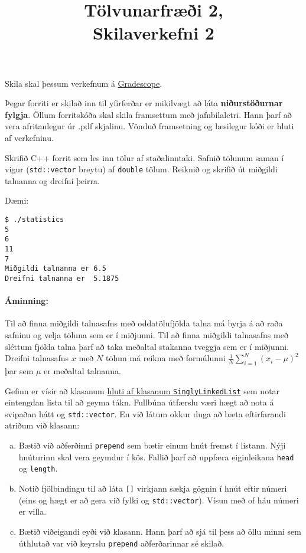 \documentclass{article}
\title{Tölvunarfræði 2, \semester \\ Skilaverkefni 2}
\author{}
\begin{document}
\maketitle
{}

Skila skal þessum verkefnum á \href{https://gradescope.com/courses/14122}{Gradescope}.

Þegar forriti er skilað inn til yfirferðar er mikilvægt að láta \textbf{niðurstöðurnar fylgja}. Öllum forritskóða skal skila framsettum með jafnbilaletri. Hann þarf að vera afritanlegur úr .pdf skjalinu. Vönduð framsetning og læsilegur kóði er hluti af verkefninu.

\question

Skrifið C++ forrit sem les inn tölur af staðalinntaki. Safnið tölunum saman í vigur (\texttt{std::vector} breytu) af \texttt{double} tölum. Reiknið og skrifið út miðgildi  talnanna og dreifni  þeirra.

Dæmi:
\begin{verbatim}
$ ./statistics
5
6
11
7
Miðgildi talnanna er 6.5
Dreifni talnanna er  5.1875
\end{verbatim}

\paragraph{Áminning:} Til að finna miðgildi talnasafns með oddatölufjölda talna má byrja á að raða safninu og velja töluna sem er í miðjunni. Til að finna miðgildi talnasafns með sléttum fjölda talna þarf að taka meðaltal stakanna tveggja sem er í miðjunni. Dreifni talnasafns $x$ með $N$ tölum má reikna með formúlunni $\frac{1}{N} \sum_{i=1}^N(x_i - \mu)^2$ þar sem $\mu$ er meðaltal talnanna.

\question

Gefinn er vísir að klasanum \href{https://raw.githubusercontent.com/Ernir/kennsluefni/master/T2/Code/w3/singlylinkedlist.cpp}{hluti af klasanum \texttt{SinglyLinkedList}} sem notar eintengdan lista til að geyma tákn. Fullbúna útfærslu væri hægt að nota á svipaðan hátt og \texttt{std::vector}. En við látum okkur duga að bæta eftirfarandi atriðum við klasann:

\begin{enumerate}[a)]
	\item Bætið við aðferðinni \texttt{prepend} sem bætir einum hnút fremst í listann. Nýji hnúturinn skal vera geymdur í kös. Fallið þarf að uppfæra eiginleikana \texttt{head} og \texttt{length}.
	\item Notið fjölbindingu til að láta \texttt{[]} virkjann sækja gögnin í hnút eftir númeri (eins og hægt er að gera við fylki og \texttt{std::vector}). Vísun með of háu númeri er villa.
	\item Bætið viðeigandi eyði  við klasann. Hann þarf að sjá til þess að öllu minni sem úthlutað var við keyrslu \texttt{prepend} aðferðarinnar sé skilað.
\end{enumerate}
\end{document}
